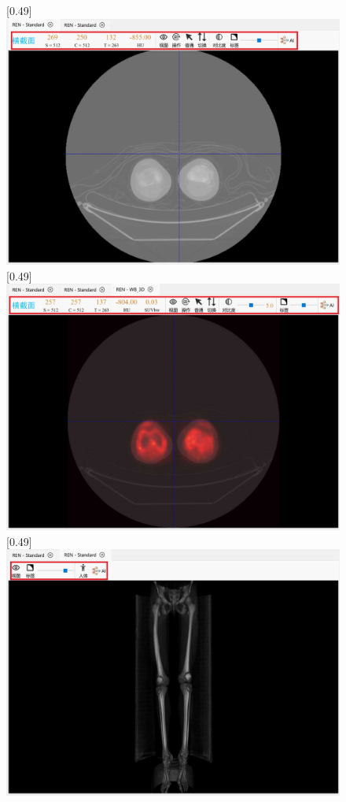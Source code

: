 \begin{figure}[htbp]
  \centering
  [0.49\textwidth]{\includegraphics[scale=0.3]{figures/chap05_view_2D.jpg}}
  [0.49\textwidth]{\includegraphics[scale=0.3]{figures/chap05_view_2DF.jpg}}
  [0.49\textwidth]{\includegraphics[scale=0.3]{figures/chap05_view_3D.jpg}}

\end{figure}
